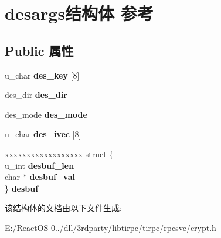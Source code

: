\hypertarget{structdesargs}{}\section{desargs结构体 参考}
\label{structdesargs}
\subsection*{Public 属性}
\begin{DoxyCompactItemize}
\item 
\mbox{\label{structdesargs_ab6f2063d2b2543b45cc22c5fa585328c}} 
u\+\_\+char {\bfseries des\+\_\+key} \mbox{[}8\mbox{]}
\item 
\mbox{\label{structdesargs_a28d9a8800ce79235b7dbdea068a2f094}} 
des\+\_\+dir {\bfseries des\+\_\+dir}
\item 
\mbox{\label{structdesargs_aad32655cc4d250c68bfca058093496e8}} 
des\+\_\+mode {\bfseries des\+\_\+mode}
\item 
\mbox{\label{structdesargs_a8baea1b26d0bdd6dcb53bbb96d0e35d5}} 
u\+\_\+char {\bfseries des\+\_\+ivec} \mbox{[}8\mbox{]}
\item 
\mbox{\label{structdesargs_aab5ee77677b0c89e482d903352c63b30}} 
\begin{tabbing}
xx\=xx\=xx\=xx\=xx\=xx\=xx\=xx\=xx\=\kill
struct \{\\
\>u\_int {\bfseries desbuf\_len}\\
\>char $\ast$ {\bfseries desbuf\_val}\\
\} {\bfseries desbuf}\\

\end{tabbing}\end{DoxyCompactItemize}


该结构体的文档由以下文件生成\+:\begin{DoxyCompactItemize}
\item 
E\+:/\+React\+O\+S-\/0../dll/3rdparty/libtirpc/tirpc/rpcsvc/crypt.\+h\end{DoxyCompactItemize}
